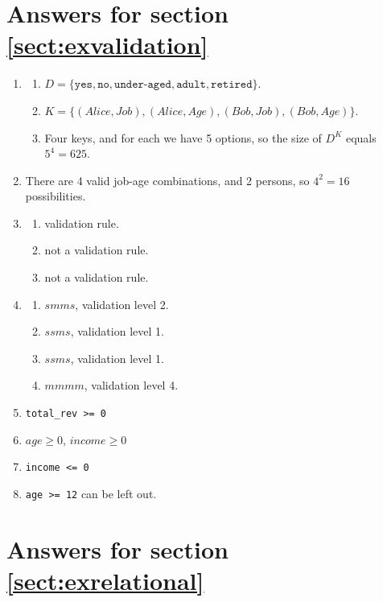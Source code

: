 \section*{Answers for section \ref{sect:exvalidation}}
\label{sect:ansvalidation}
\begin{enumerate}
  \item
  \begin{enumerate}
    \item $D = \{\texttt{yes}, \texttt{no}, \texttt{under-aged}, \texttt{adult},\texttt{retired}\}$.
    \item $K = \{(Alice, Job), (Alice, Age), (Bob, Job), (Bob, Age)\}$.
    \item Four keys, and for each we have 5 options, so the size of $D^K$ equals $5^4=625$.
  \end{enumerate}
  \item There are 4 valid job-age combinations, and 2 persons, so $4^2=16$ possibilities.
  \item
  \begin{enumerate}
    \item validation rule.
    \item not a validation rule.
    \item not a validation rule.
  \end{enumerate}
  \item
  \begin{enumerate}
    \item $smms$, validation level 2.
    \item $ssms$, validation level 1.
    \item $ssms$, validation level 1.
    \item $mmmm$, validation level 4.
    \addtocounter{enumi}{1}
  \end{enumerate}
  \item \verb+total_rev >= 0+
  \item $age \geq 0$, $income \geq 0$
  \item \verb+income <= 0+
  \item \verb+age >= 12+ can be left out.
\end{enumerate}


\section*{Answers for section \ref{sect:exrelational}}
\label{sect:ansrelational}

